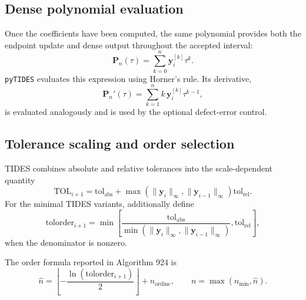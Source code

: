 \documentclass[11pt]{article}
\begin{document}
\subsection{Dense polynomial evaluation}

Once the coefficients have been computed, the same polynomial provides both
the endpoint update and dense output throughout the accepted interval:
\begin{equation}
    \bm P_n(\tau)=\sum_{k=0}^{n}\bm y_i^{[k]}\tau^k.
\end{equation}
\texttt{pyTIDES} evaluates this expression using Horner's rule. Its derivative,
\begin{equation}
    \bm P_n'(\tau)
    =
    \sum_{k=1}^{n}k\,\bm y_i^{[k]}\tau^{k-1},
    \label{eq:taylor-derivative}
\end{equation}
is evaluated analogously and is used by the optional defect-error control.

\subsection{Tolerance scaling and order selection}

TIDES combines absolute and relative tolerances into the scale-dependent
quantity
\begin{equation}
    \mathrm{TOL}_{i+1}
    =
    \mathrm{tol}_{\mathrm{abs}}
    +
    \max\left(
        \|\bm y_i\|_\infty,
        \|\bm y_{i-1}\|_\infty
    \right)\mathrm{tol}_{\mathrm{rel}}.
    \label{eq:tides-tol}
\end{equation}
For the minimal TIDES variants, \citet{Abad2012} additionally define
\begin{equation}
    \mathrm{tolorder}_{i+1}
    =
    \min\left[
        \frac{\mathrm{tol}_{\mathrm{abs}}}
        {\min(\|\bm y_i\|_\infty,\|\bm y_{i-1}\|_\infty)},
        \mathrm{tol}_{\mathrm{rel}}
    \right],
    \label{eq:tides-tolorder}
\end{equation}
when the denominator is nonzero.

The order formula reported in Algorithm 924 is
\begin{equation}
    \widehat n
    =
    \left\lfloor
        -\frac{\ln(\mathrm{tolorder}_{i+1})}{2}
    \right\rfloor+n_{\mathrm{ordinc}},
    \qquad
    n=\max(n_{\min},\widehat n).
    \label{eq:tides-order-original}
\end{equation}
\end{document}
